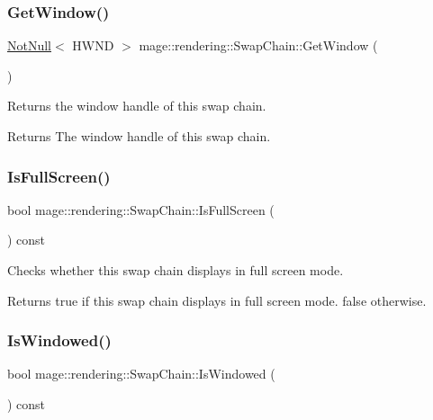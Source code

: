\subsubsection{\texorpdfstring{Get\+Window()}{GetWindow()}}
{\footnotesize\ttfamily \hyperlink{namespacemage_a8769f9d670d6b585ea306cb1062af94b}{Not\+Null}$<$ H\+W\+ND $>$ mage\+::rendering\+::\+Swap\+Chain\+::\+Get\+Window (\begin{DoxyParamCaption}{ }\end{DoxyParamCaption})\hspace{0.3cm}{\ttfamily [noexcept]}}

Returns the window handle of this swap chain.

\begin{DoxyReturn}{Returns}
The window handle of this swap chain. 
\end{DoxyReturn}
\hypertarget{classmage_1_1rendering_1_1_swap_chain_aa5643411827a2eccd04e46368193b762}{}\label{classmage_1_1rendering_1_1_swap_chain_aa5643411827a2eccd04e46368193b762} 
\subsubsection{\texorpdfstring{Is\+Full\+Screen()}{IsFullScreen()}}
{\footnotesize\ttfamily bool mage\+::rendering\+::\+Swap\+Chain\+::\+Is\+Full\+Screen (\begin{DoxyParamCaption}{ }\end{DoxyParamCaption}) const\hspace{0.3cm}{\ttfamily [noexcept]}}

Checks whether this swap chain displays in full screen mode.

\begin{DoxyReturn}{Returns}
{\ttfamily true} if this swap chain displays in full screen mode. {\ttfamily false} otherwise. 
\end{DoxyReturn}
\hypertarget{classmage_1_1rendering_1_1_swap_chain_a7059719bc0f821baada358534b935778}{}\label{classmage_1_1rendering_1_1_swap_chain_a7059719bc0f821baada358534b935778} 
\subsubsection{\texorpdfstring{Is\+Windowed()}{IsWindowed()}}
{\footnotesize\ttfamily bool mage\+::rendering\+::\+Swap\+Chain\+::\+Is\+Windowed (\begin{DoxyParamCaption}{ }\end{DoxyParamCaption}) const\hspace{0.3cm}{\ttfamily [noexcept]}}


